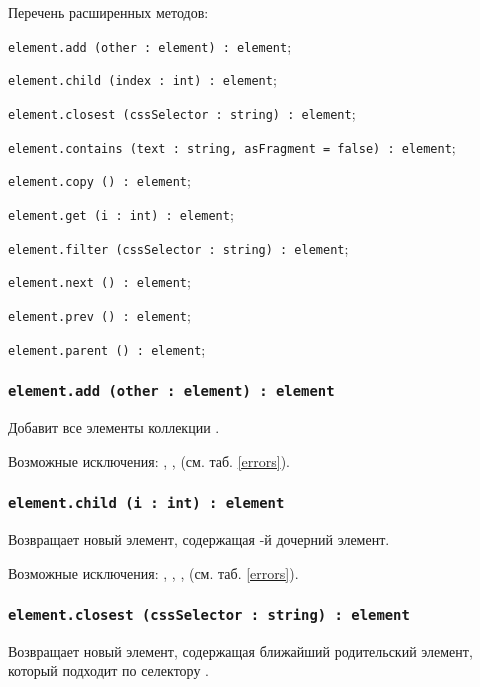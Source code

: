 Перечень расширенных методов:
\begin{icItems}
    \item \lstinline|element.add (other : element) : element|;
	\item \lstinline|element.child (index : int) : element|;
	\item \lstinline|element.closest (cssSelector : string) : element|;
	\item \lstinline|element.contains (text : string, asFragment = false) : element|;
	\item \lstinline|element.copy () : element|;
	\item \lstinline|element.get (i : int) : element|;
	\item \lstinline|element.filter (cssSelector : string) : element|;
	\item \lstinline|element.next () : element|;
	\item \lstinline|element.prev () : element|;
	\item \lstinline|element.parent () : element|;
\end{icItems}

\subsubsection{\lstinline|element.add (other : element) : element|}

Добавит все элементы коллекции .

Возможные исключения: , ,  (см. таб. \ref{errors}).

\subsubsection{\lstinline|element.child (i : int) : element|}

Возвращает новый элемент, содержащая -й дочерний элемент.

Возможные исключения: , , ,  (см. таб. \ref{errors}).

\subsubsection{\lstinline|element.closest (cssSelector : string) : element|}

Возвращает новый элемент, содержащая ближайший родительский элемент, который подходит по селектору .

